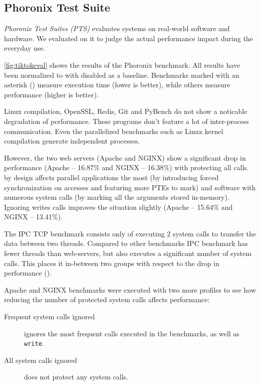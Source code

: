 \subsection{Phoronix Test Suite}

\emph{Phoronix Test Suites (PTS)} evaluates systems on real-world software and
hardware. We evaluated \sysname on it to judge the actual performance impact
during the everyday use.

\autoref{fig:tiktokeval} shows the results of the Phoronix benchmark. All
results have been normalized to with \sysname disabled as a baseline. Benchmarks
marked with an asterisk (\*) measure execution time (lower is better), while others
measure performance (higher is better).

Linux compilation, OpenSSL, Redis, Git and PyBench do not show a noticable
degradation of performance. These programs don't feature a lot of inter-process
communication. Even the parallelized benchmarks such as Linux kernel compilation
generate independent processes.

However, the two web servers (Apache and NGINX) show a significant drop in
performance (Apache -- 16.87\% and NGINX -- 16.38\%) with \sysname protecting all calls. \sysname
by design affects parallel applications the most (by introducing forced
synchronization on accesses and featuring more PTEs to mark) and software with
numerous system calls (by marking all the arguments stored in-memory). Ignoring
writes calls improves the situation slightly (Apache -- 15.64\% and NGINX -- 13.41\%).

The IPC TCP benchmark consists only of executing 2 system calls to transfer
the data between two threads. Compared to other benchmarks IPC benchmark has fewer
threads than web-servers, but also executes a significant number of system calls.
This places it in-between two groups with respect to the drop in performance ().

Apache and NGINX benchmarks were executed with two more \sysname profiles to 
see how reducing the number of protected system calls affects performance:

\begin{description}
  \item[Frequent system calls ignored] ignores the most frequent calls executed in the benchmarks, as well as \texttt{write}.
  \item[All system calls ignored] does not protect any system calls.
\end{description}

